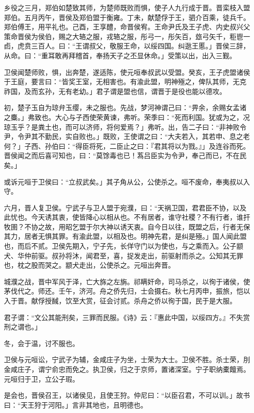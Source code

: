 \documentclass[]{article}
\begin{document}
乡役之三月，郑伯如楚致其师，为楚师既败而惧，使子人九行成于晋。晋栾枝入盟郑伯。五月丙午，晋侯及郑伯盟于衡雍。丁未，献楚俘于王，驷介百乘，徒兵千。郑伯傅王，用平礼也。己酉，王享醴，命晋侯宥。王命尹氏及王子虎、内史叔兴父策命晋侯为侯伯，赐之大辂之服，戎辂之服，彤弓一，彤矢百，玈弓矢千，秬鬯一卣，虎贲三百人。曰：``王谓叔父，敬服王命，以绥四国。纠逖王慝。」晋侯三辞，从命。曰：``重耳敢再拜稽首，奉扬天子之丕显休命。」受策以出，出入三觐。

卫侯闻楚师败，惧，出奔楚，遂适陈，使元咺奉叔武以受盟。癸亥，王子虎盟诸侯于王庭，要言曰：``皆奖王室，无相害也。有渝此盟，明神殛之，俾队其师，无克祚国，及而玄孙，无有老幼。」君子谓是盟也信，谓晋于是役也能以德攻。

初，楚子玉自为琼弁玉缨，未之服也。先战，梦河神谓己曰：``畀余，余赐女孟诸之麋。」弗致也。大心与子西使荣黄谏，弗听。荣季曰：``死而利国。犹或为之，况琼玉乎？是粪土也，而可以济师，将何爱焉？」弗听。出，告二子曰：``非神败令尹，令尹其不勤民，实自败也。」既败，王使谓之曰：``大夫若入，其若申、息之老何？」子西、孙伯曰：``得臣将死，二臣止之曰：『君其将以为戮。』」及连谷而死。晋侯闻之而后喜可知也，曰：``莫馀毒也已！蒍吕臣实为令尹，奉己而已，不在民矣。」

或诉元咺于卫侯曰：``立叔武矣。」其子角从公，公使杀之。咺不废命，奉夷叔以入守。

六月，晋人复卫侯。宁武子与卫人盟于宛濮，曰：``天祸卫国，君君臣不协，以及此忧也。今天诱其衷，使皆降心以相从也。不有居者，谁守社稷？不有行者，谁扞牧圉？不协之故，用昭乞盟于尔大神以诱天衷。自今日以往，既盟之后，行者无保其力，居者无惧其罪。有渝此盟，以相及也。明神先君，是纠是殛。」国人闻此盟也，而后不贰。卫侯先期入，宁子先，长佯守门以为使也，与之乘而入。公子颛犬、华仲前驱。叔孙将沐，闻君至，喜，捉发走出，前驱射而杀之。公知其无罪也，枕之股而哭之。颛犬走出，公使杀之。元咺出奔晋。

城濮之战，晋中军风于泽，亡大旆之左旃。祁瞒奸命，司马杀之，以徇于诸侯，使茅伐代之。师还。壬午，济河。舟之侨先归，士会摄右。秋七月丙申，振旅，恺以入于晋。献俘授馘，饮至大赏，征会讨贰。杀舟之侨以徇于国，民于是大服。

君子谓：``文公其能刑矣，三罪而民服。《诗》云：『惠此中国，以绥四方。』不失赏刑之谓也。」

冬，会于温，讨不服也。

卫侯与元咺讼，宁武子为辅，金咸庄子为坐，士荣为大士。卫侯不胜。杀士荣，刖金咸庄子，谓宁俞忠而免之。执卫侯，归之于京师，置诸深室。宁子职纳橐饘焉。元咺归于卫，立公子瑕。

是会也，晋侯召王，以诸侯见，且使王狩。仲尼曰：``以臣召君，不可以训。」故书曰：``天王狩于河阳。」言非其地也，且明德也。
\end{document}
